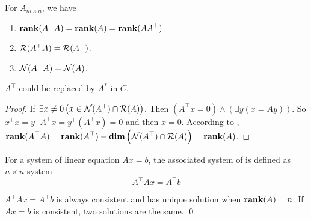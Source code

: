 \begin{theorem}\label{rankofadjoint}
    For $A_{m \times n}$, we have
    \begin{enumerate}
        \item $\displaystyle \mathbf{rank}( A^\top A ) = \displaystyle \mathbf{rank}( A ) = \displaystyle \mathbf{rank}( A A^\top )$.
        \item $\mathcal{R}(A^\top A) = \mathcal{R}(A^\top)$.
        \item $\mathcal{N}(A^\top A) = \mathcal{N}(A)$.
    \end{enumerate}
    $A^\top$ could be replaced by $A^*$ in $C$.
\end{theorem}
\begin{proof}
    If $\exists x \neq 0 \left(x \in \mathcal{N}(A^\top) \cap \mathcal{R}(A) \right)$. Then $(A^\top x = 0) \wedge \left(\exists y(x = A y) \right)$. So $x^\top x = y^\top A^\top x = y^\top ( A^\top x) = 0 $ and then $x =0$. According to , $\displaystyle \mathbf{rank}( A^\top A ) = \displaystyle \mathbf{rank}( A^\top ) - \displaystyle \mathbf{dim}\left( \mathcal{N}(A^\top) \cap \mathcal{R}(A) \right) = \displaystyle \mathbf{rank}( A )$.
\end{proof}

\begin{theorem}
    For a system of linear equation $Ax = b$, the associated system of  is defined as $n \times n$ system
    \begin{equation}
        A^\top A x = A^\top b
    \end{equation}
    
    $A^\top A x = A^\top b$ is always consistent and has unique solution when $\displaystyle \mathbf{rank}( A ) = n$. If $Ax=b$ is consistent, two solutions are the same. \qed
\end{theorem}



